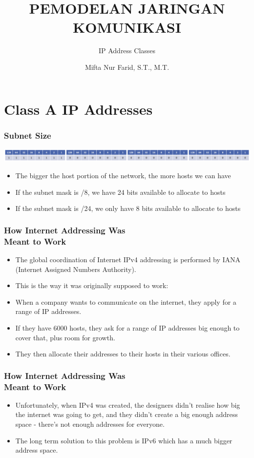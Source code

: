 \documentclass[pdflatex,compress]{beamer}
\title{PEMODELAN JARINGAN KOMUNIKASI}
\subtitle{IP Address Classes}
\author{Mifta Nur Farid, S.T., M.T.}
\begin{document}
\maketitle

\section{Class A IP Addresses}

\begin{frame}
	\frametitle{Subnet Size}
	\begin{center}
		\includegraphics[width=1\linewidth]{img/img01}
	\end{center}
	\begin{itemize}
		\item The bigger the host portion of the network, the more hosts we can have
		\item If the subnet mask is /8, we have 24 bits available to allocate to hosts
		\item If the subnet mask is /24, we only have 8 bits available to allocate to hosts
	\end{itemize}
\end{frame}

\begin{frame}
	\frametitle{How Internet Addressing Was\\Meant to Work}
	\begin{itemize}
		\item The global coordination of Internet IPv4 addressing is performed by IANA (Internet Assigned Numbers Authority).
		\item This is the way it was originally supposed to work:
		\item When a company wants to communicate on the internet, they apply for a range of IP addresses.
		\item If they have 6000 hosts, they ask for a range of IP addresses big enough to cover that, plus room for growth.
		\item They then allocate their addresses to their hosts in their various offices.
	\end{itemize}
\end{frame}

\begin{frame}
	\frametitle{How Internet Addressing Was\\Meant to Work}
	\begin{itemize}
		\item Unfortunately, when IPv4 was created, the designers didn't realise how big the internet was going to get, and they didn't create a big enough address space - there's not enough addresses for everyone.
		\item The long term solution to this problem is IPv6 which has a much bigger address space.
	\end{itemize}
\end{frame}
\end{document}
